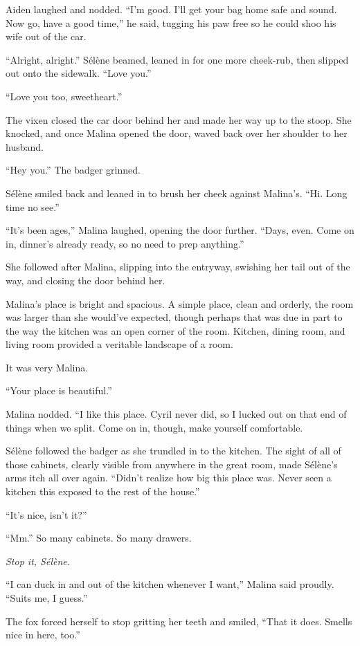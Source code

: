 Aiden laughed and nodded. ``I'm good. I'll get your bag home safe and sound. Now go, have a good time,'' he said, tugging his paw free so he could shoo his wife out of the car.

``Alright, alright.'' Sélène beamed, leaned in for one more cheek-rub, then slipped out onto the sidewalk. ``Love you.''

``Love you too, sweetheart.''

The vixen closed the car door behind her and made her way up to the stoop. She knocked, and once Malina opened the door, waved back over her shoulder to her husband.

``Hey you.'' The badger grinned.

Sélène smiled back and leaned in to brush her cheek against Malina's. ``Hi. Long time no see.''

``It's been ages,'' Malina laughed, opening the door further. ``Days, even. Come on in, dinner's already ready, so no need to prep anything.''

She followed after Malina, slipping into the entryway, swishing her tail out of the way, and closing the door behind her.

Malina's place is bright and spacious. A simple place, clean and orderly, the room was larger than she would've expected, though perhaps that was due in part to the way the kitchen was an open corner of the room. Kitchen, dining room, and living room provided a veritable landscape of a room.

It was very Malina.

``Your place is beautiful.''

Malina nodded. ``I like this place. Cyril never did, so I lucked out on that end of things when we split. Come on in, though, make yourself comfortable.

Sélène followed the badger as she trundled in to the kitchen. The sight of all of those cabinets, clearly visible from anywhere in the great room, made Sélène's arms itch all over again. ``Didn't realize how big this place was. Never seen a kitchen this exposed to the rest of the house.''

``It's nice, isn't it?''

``Mm.'' So many cabinets. So many drawers.

\emph{Stop it, Sélène.}

``I can duck in and out of the kitchen whenever I want,'' Malina said proudly. ``Suits me, I guess.''

The fox forced herself to stop gritting her teeth and smiled, ``That it does. Smells nice in here, too.''

